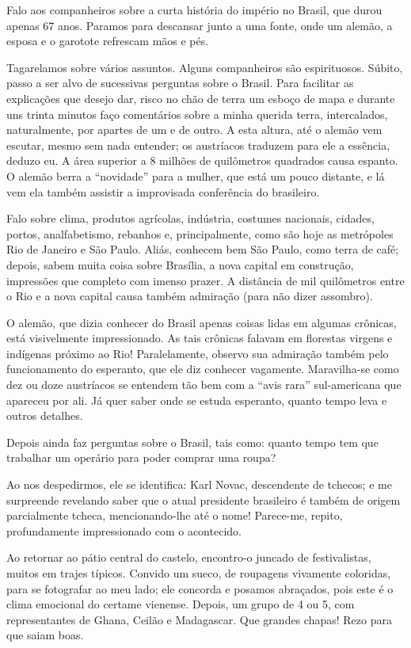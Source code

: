Falo aos companheiros sobre a curta história do império no Brasil, que durou apenas 67 anos. Paramos para descansar junto a uma fonte, onde um alemão, a esposa e o garotote refrescam mãos e pés.

Tagarelamos sobre vários assuntos. Alguns companheiros são espirituosos. Súbito, passo a ser alvo de sucessivas perguntas sobre o Brasil. Para facilitar as explicações que desejo dar, risco no chão de terra um esboço de mapa e durante uns trinta minutos faço comentários sobre a minha querida terra, intercalados, naturalmente, por apartes de um e de outro. A esta altura, até o alemão vem escutar, mesmo sem nada entender; os austríacos traduzem para ele a essência, deduzo eu. A área superior a 8 milhões de quilômetros quadrados causa espanto. O alemão berra a ``novidade'' para a mulher, que está um pouco distante, e lá vem ela também assistir a improvisada conferência do brasileiro.

Falo sobre clima, produtos agrícolas, indústria, costumes nacionais, cidades, portos, analfabetismo, rebanhos e, principalmente, como são hoje as metrópoles Rio de Janeiro e São Paulo. Aliás, conhecem bem São Paulo, como terra de café; depois, sabem muita coisa sobre Brasília, a nova capital em construção, impressões que completo com imenso prazer. A distância de mil quilômetros entre o Rio e a nova capital causa também admiração (para não dizer assombro).

O alemão, que dizia conhecer do Brasil apenas coisas lidas em algumas crônicas, está visivelmente impressionado. As tais crônicas falavam em florestas virgens e indígenas próximo ao Rio! Paralelamente, observo sua admiração também pelo funcionamento do esperanto, que ele diz conhecer vagamente. Maravilha-se como dez ou doze austríacos se entendem tão bem com a ``avis rara'' sul-americana que apareceu por ali. Já quer saber onde se estuda esperanto, quanto tempo leva e outros detalhes.

Depois ainda faz perguntas sobre o Brasil, tais como: quanto tempo tem que trabalhar um operário para poder comprar uma roupa?

Ao nos despedirmos, ele se identifica: Karl Novac, descendente de tchecos; e me surpreende revelando saber que o atual presidente brasileiro é também de origem parcialmente tcheca, mencionando-lhe até o nome! Parece-me, repito, profundamente impressionado com o acontecido.

Ao retornar ao pátio central do castelo, encontro-o juncado de festivalistas, muitos em trajes típicos. Convido um sueco, de roupagens vivamente coloridas, para se fotografar ao meu lado; ele concorda e posamos abraçados, pois este é o clima emocional do certame vienense. Depois, um grupo de 4 ou 5, com representantes de Ghana, Ceilão e Madagascar. Que grandes chapas! Rezo para que saiam boas.

